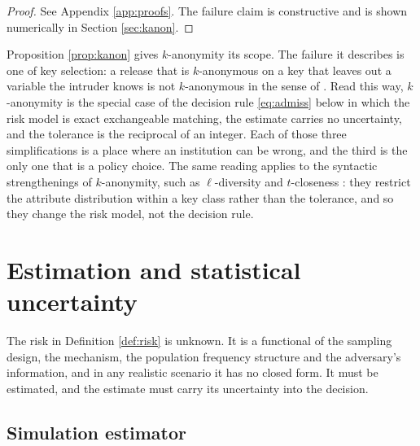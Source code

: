\documentclass[11pt,a4paper]{article}
\theoremstyle{plain}
\theoremstyle{definition}
\theoremstyle{definition}
\theoremstyle{plain}
\begin{document}
\begin{proof}
See Appendix \ref{app:proofs}. The failure claim is constructive and is shown numerically in Section
\ref{sec:kanon}.
\end{proof}

Proposition \ref{prop:kanon} gives $k$-anonymity its scope. The failure it
describes is one of key selection: a release that is $k$-anonymous on a key that
leaves out a variable the intruder knows is not $k$-anonymous in the sense of
\citet{sweeney2002} \citep[ch.~3]{hundepool2012}. Read this way, $k$-anonymity is
the special case of the decision rule
\eqref{eq:admiss} below in which the risk model is exact exchangeable matching,
the estimate carries no uncertainty, and the tolerance is the reciprocal of an
integer. Each of those three simplifications is a place where an institution
can be wrong, and the third is the only one that is a policy choice. The same
reading applies to the syntactic strengthenings of $k$-anonymity, such as
$\ell$-diversity \citep{machanavajjhala2007} and $t$-closeness
\citep{li2007}: they restrict the attribute distribution within a key class
rather than the tolerance, and so they change the risk model, not the decision
rule.

\section{Estimation and statistical uncertainty}\label{sec:est}

The risk in Definition \ref{def:risk} is unknown. It is a functional of the
sampling design, the mechanism, the population frequency structure and the
adversary's information, and in any realistic scenario it has no closed form.
It must be estimated, and the estimate must carry its uncertainty into the
decision.

\subsection{Simulation estimator}
\end{document}
